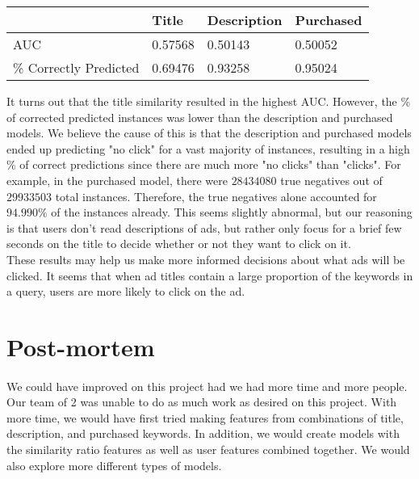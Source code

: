 \documentclass[11pt]{article}
\begin{document}
\begin{center}
\begin{tabular}{| l | l | l | l |}
\hline
& Title & Description & Purchased \\ \hline
AUC & 0.57568 & 0.50143 & 0.50052 \\ \hline
\% Correctly Predicted & 0.69476 & 0.93258 & 0.95024 \\ \hline
\end{tabular}
\end{center}

It turns out that the title similarity resulted in the highest AUC. However, the \% of corrected predicted instances was lower than the description and purchased models. We believe the cause of this is that the description and purchased models ended up predicting "no click" for a vast majority of instances, resulting in a high \% of correct predictions since there are much more "no clicks" than "clicks". For example, in the purchased model, there were $28434080$ true negatives out of $29933503$ total instances. Therefore, the true negatives alone accounted for $94.990\%$ of the instances already. This seems slightly abnormal, but our reasoning is that users don't read descriptions of ads, but rather only focus for a brief few seconds on the title to decide whether or not they want to click on it. \\

These results may help us make more informed decisions about what ads will be clicked. It seems that when ad titles contain a large proportion of the keywords in a query, users are more likely to click on the ad. \\

\section*{Post-mortem}
\paragraph{}
We could have improved on this project had we had more time and more people. Our team of 2 was unable to do as much work as desired on this project. With more time, we would have first tried making features from combinations of title, description, and purchased keywords. In addition, we would create models with the similarity ratio features as well as user features combined together. We would also explore more different types of models. \\
\end{document}
